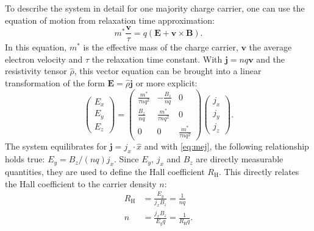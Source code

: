 To describe the system in detail for one majority charge carrier, one can use the 
equation of motion from relaxation time approximation:
\begin{equation}
	m^{*} \frac{\mathbf{v}}{\tau}=q(\mathbf{E}
	+\mathbf{v}\times \mathbf{B}).
\end{equation}
In this equation, $m^{*}$ is the effective mass of the charge carrier, $\mathbf{v}$ the
average electron velocity and $\tau$ the relaxation time constant.
With $\mathbf{j}=nq\mathbf{v}$ and the resistivity tensor $\hat{\rho}$, 
this vector equation can be brought into a linear transformation of the form
$\mathbf{E}=\hat{\rho}\mathbf{j}$ or more explicit:
\begin{equation}
	\label{eq:mej}
	\begin{pmatrix}
		E_{x} \\
		E_{y} \\
		E_{z}
	\end{pmatrix}
	=
	\begin{pmatrix}
		\frac{m^{*}}{\tau nq^{2}} & - \frac{B_{z}}{nq}        & 0                         \\
		\frac{B_{z}}{nq}          & \frac{m^{*}}{\tau nq^{2}} & 0                         \\
		0                         & 0                         & \frac{m^{*}}{\tau nq^{2}}
	\end{pmatrix}
	\begin{pmatrix}
		j_{x} \\
		j_{y} \\
		j_{z}
	\end{pmatrix}.
\end{equation}
The system equilibrates for $\mathbf{j} = j_x \cdot \hat{x}$ and with \cref{eq:mej}, the following
relationship holds true: $E_{y} = B_{z} / (nq) j_{x}$.
Since $E_y$, $j_x$ and $B_z$ are directly measurable quantities,
they are used to define the Hall coefficient $R_{\mathrm{H}}$.
This directly relates the Hall coefficient to the carrier density $n$:
\begin{align}
	R_{\mathrm{H}}&=\frac{E_{y}}{j_{x}B_{z}}=\frac{1}{nq}
	\label{eq:hall_coefficient} \\
	n&=\frac{j_{x}B_{z}}{E_{y}q} = \frac{1}{R_{\mathrm{H}}q}.
	\label{eq:hall_concentration}
\end{align}

